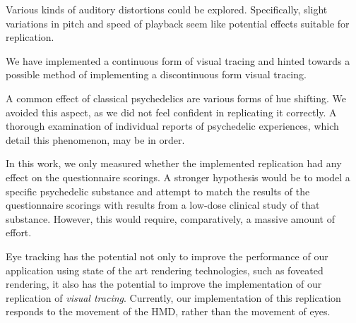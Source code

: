 Various kinds of auditory distortions could be explored. Specifically, slight variations in pitch and speed of playback seem like potential effects suitable for replication.

We have implemented a continuous form of visual tracing and hinted towards a possible method of implementing a discontinuous form visual tracing.

A common effect of classical psychedelics are various forms of hue shifting. We avoided this aspect, as we did not feel confident in replicating it correctly. A thorough examination of individual reports of psychedelic experiences, which detail this phenomenon, may be in order.

In this work, we only measured whether the implemented replication had any effect on the questionnaire scorings. A stronger hypothesis would be to model a specific psychedelic substance and attempt to match the results of the questionnaire scorings with results from a low-dose clinical study of that substance. However, this would require, comparatively, a massive amount of effort.

Eye tracking has the potential not only to improve the performance of our application using state of the art rendering technologies, such as foveated rendering, it also has the potential to improve the implementation of our replication of \textit{visual tracing}. Currently, our implementation of this replication responds to the movement of the \ac{HMD}, rather than the movement of eyes.

